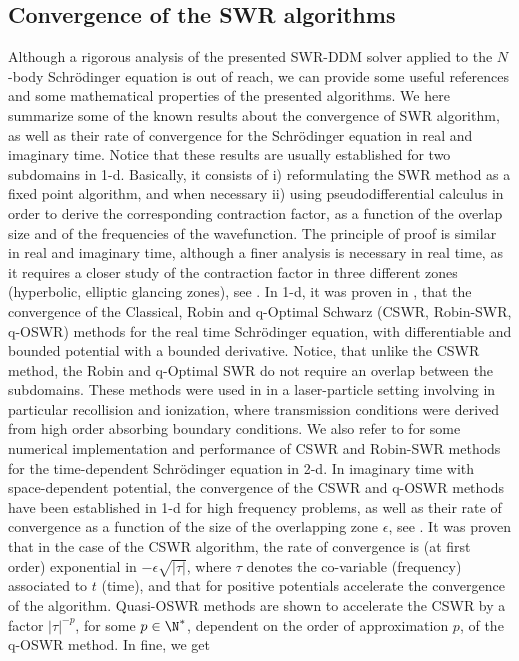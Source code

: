\subsection{Convergence of the SWR algorithms}
Although a rigorous analysis of the presented SWR-DDM solver applied to the $N$-body Schr\"odinger equation is out of reach, we can provide some useful references and some mathematical properties of the presented algorithms. We here summarize some of the known results about the convergence of SWR algorithm, as well as their rate of convergence for the Schr\"odinger equation in real and imaginary time. Notice that these results are usually established for two subdomains in 1-d. Basically, it consists of i) reformulating the SWR method as a fixed point algorithm, and when necessary ii)  using pseudodifferential calculus in order to derive the corresponding contraction factor, as a function of the overlap size and of the frequencies of the wavefunction. The principle of proof is similar in real and imaginary time, although a finer analysis is necessary in real time, as it requires a closer study of the contraction factor in three different zones (hyperbolic, elliptic glancing zones), see \cite{nir}. 
In 1-d, it was proven in \cite{halpern2}, that the convergence of the Classical, Robin and q-Optimal Schwarz (CSWR, Robin-SWR, q-OSWR) methods for the real time Schr\"odinger equation, with differentiable and bounded potential with a bounded derivative. Notice, that unlike the CSWR method, the Robin and q-Optimal SWR do not require an overlap between the subdomains. These methods were used in \cite{jsc} in a laser-particle setting involving in particular recollision and ionization, where transmission conditions were derived from high order absorbing boundary conditions. We also refer to \cite{BesseXing} for some numerical implementation and performance of CSWR and Robin-SWR methods for the time-dependent Schr\"odinger equation in 2-d. In imaginary time with space-dependent potential, the convergence of the CSWR and q-OSWR methods have been established in 1-d for high frequency problems, as well as their rate of convergence as a function of the size  of the overlapping zone $\epsilon$, see \cite{lorin-TBS}. It was proven that in the case of the CSWR algorithm, the rate of convergence is (at first order) exponential in $-\epsilon \sqrt{|\tau|}$, where $\tau$ denotes the co-variable (frequency) associated to $t$ (time), and that for positive potentials accelerate the convergence of the algorithm. Quasi-OSWR methods are shown to accelerate the CSWR by a factor $|\tau|^{-p}$, for some $p \in \N^*$, dependent on the order of approximation $p$, of the q-OSWR method. In fine, we get
